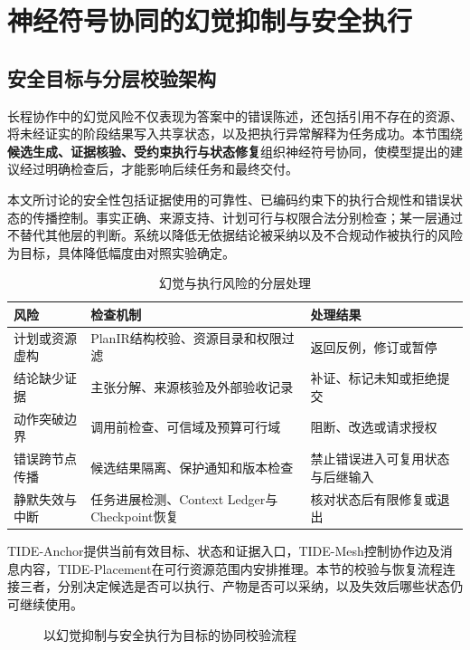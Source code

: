 \section{神经符号协同的幻觉抑制与安全执行}
\label{sec:mechanism_coordination}

\subsection{安全目标与分层校验架构}

长程协作中的幻觉风险不仅表现为答案中的错误陈述，还包括引用不存在的资源、将未经证实的阶段结果写入共享状态，以及把执行异常解释为任务成功。本节围绕\textbf{候选生成、证据核验、受约束执行与状态修复}组织神经符号协同，使模型提出的建议经过明确检查后，才能影响后续任务和最终交付。

本文所讨论的安全性包括证据使用的可靠性、已编码约束下的执行合规性和错误状态的传播控制。事实正确、来源支持、计划可行与权限合法分别检查；某一层通过不替代其他层的判断。系统以降低无依据结论被采纳以及不合规动作被执行的风险为目标，具体降低幅度由对照实验确定。

\begin{table}[htbp]
\centering
\caption{幻觉与执行风险的分层处理}
\label{tab:safety_risks}
\begin{tabular}{p{}p{}p{}}
\toprule
风险 & 检查机制 & 处理结果 \\
\midrule
计划或资源虚构 & PlanIR结构校验、资源目录和权限过滤 & 返回反例，修订或暂停 \\
结论缺少证据 & 主张分解、来源核验及外部验收记录 & 补证、标记未知或拒绝提交 \\
动作突破边界 & 调用前检查、可信域及预算可行域 & 阻断、改选或请求授权 \\
错误跨节点传播 & 候选结果隔离、保护通知和版本检查 & 禁止错误进入可复用状态与后继输入 \\
静默失效与中断 & 任务进展检测、Context Ledger与Checkpoint恢复 & 核对状态后有限修复或退出 \\
\bottomrule
\end{tabular}
\end{table}

TIDE-Anchor提供当前有效目标、状态和证据入口，TIDE-Mesh控制协作边及消息内容，TIDE-Placement在可行资源范围内安排推理。本节的校验与恢复流程连接三者，分别决定候选是否可以执行、产物是否可以采纳，以及失效后哪些状态仍可继续使用。

\begin{figure}[htbp]
\centering
{}
\caption{以幻觉抑制与安全执行为目标的协同校验流程}
\label{fig:safety_validation_loop}
\end{figure}

